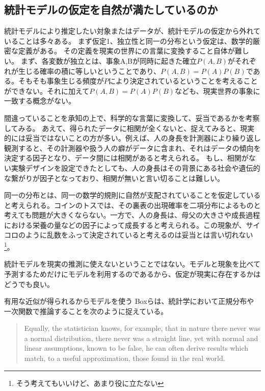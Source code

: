 \subsection{統計モデルの仮定を自然が満たしているのか}
統計モデルにより推定したい対象またはデータが、統計モデルの仮定から外れていることは多々ある。
まず仮定1、独立性と同一の分布という仮定は、数学的厳密な定義がある。
その定義を現実の世界にの言葉に変換すること自体が難しい。
まず、各変数が独立とは、事象A,Bが同時に起きた確立$P(A,B)$がそれぞれが生じる確率の積に等しいということであり、$P(A,B)=P(A)P(B)$である。そもそも事象生じる頻度が$P$により決定されているということを考えることができない。それに加えて$P(A,B)=P(A)P(B)$なども、現実世界の事象に一致する概念がない。

間違っていることを承知の上で、科学的な言葉に変換して、妥当であるかを考察してみる。
あえて、得られたデータに相関が全くないと、捉えてみると、現実的には妥当ではないことの方が多い。例えば、人の身長を計測器により繰り返し観測すると、その計測器や扱う人の癖がデータに含まれ、それはデータの傾向を決定する因子となり、データ間には相関があると考えられる。
もし、相関がない実験デザインを設定できたとしても、人の身長はその背景にある社会や遺伝的な繋がりが因子となっており、相関が無いと言い切ることは難しい。

同一の分布とは、同一の数学的規則に自然が支配されていることを仮定していると考えられる。コインのトスでは、その裏表の出現確率を二項分布によるものと考えても問題が大きくならない。一方で、人の身長は、母父の大きさや成長過程における栄養の量などの因子によって成長すると考えられる。この現象が、サイコロのように乱数をふって決定されていると考えるのは妥当とは言い切れない\footnote{そう考えてもいいけど、あまり役に立たない}。


統計モデルを現実の推測に使えないということではない。モデルと現象を比べて予測するためだけにモデルを利用するのであるから、仮定が現実に存在するかはどうでも良い。



\begin{SMbox}{有用な近似が得られるからモデルを使う}
    Boxらは、統計学において正規分布や一次関数で推論することを次のように捉えている\cite{box1976science}。
\begin{quote}
    Equally, the statistician knows, for example, that in nature there never was a normal distribution, there never was a straight line, yet with normal and linear assumptions, known to be false, he can often derive results which match, to a useful approximation, those found in the real world. 
\end{quote}
\end{SMbox}



